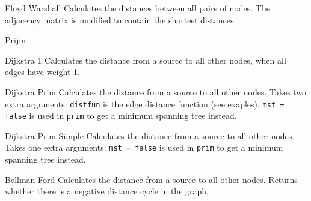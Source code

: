 \begin{algorithm}{Floyd Warshall}
\desc
Calculates the distances between all pairs of nodes.
The adjacency matrix is modified to contain the shortest distances.
\end{algorithm}

\begin{algorithm}{Prijm}
\end{algorithm}

\begin{algorithm}{Dijkstra 1}
\desc
Calculates the distance from a source to all other nodes,
when all edges have weight 1.
\end{algorithm}

\begin{algorithm}{Dijkstra Prim}
\desc
Calculates the distance from a source to all other nodes.
Takes two extra arguments:
{\tt distfun} is the edge distance function (see exaples).
{\tt mst = false} is used in {\tt prim} to get a
minimum spanning tree instead.
\end{algorithm}

\begin{algorithm}{Dijkstra Prim Simple}
\desc
Calculates the distance from a source to all other nodes.
Takes one extra arguments:
{\tt mst = false} is used in {\tt prim} to get a
minimum spanning tree instead.

\end{algorithm}

\begin{algorithm}{Bellman-Ford}
\desc
Calculates the distance from a source to all other nodes.
Returns whether there is a negative distance cycle in the graph.
\end{algorithm}

